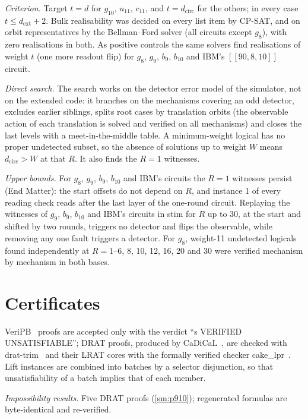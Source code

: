 \documentclass[aps,prl,twocolumn,superscriptaddress,nofootinbib]{revtex4-2}
\newcommand{\dcirc}{d_{\mathrm{circ}}}
\newcommand{\dext}{d_{\mathrm{ext}}}
\newcommand{\code}[1]{[[#1]]}
\begin{document}
\emph{Criterion.} Target $t=d$ for $g_{10}$, $u_{11}$, $c_{11}$, and $t=\dcirc$ for the
others; in every case $t\le\dext+2$. Bulk realisability was decided on every list item by
CP-SAT, and on orbit representatives by the Bellman--Ford solver (all circuits except $g_8$), with
zero realisations in both. As positive controls the same solvers find realisations of weight $t$ (one more
readout flip) for $g_8$, $g_9$, $b_9$, $b_{10}$ and IBM's $\code{90,8,10}$ circuit.

\emph{Direct search.} The search works on the detector error model of the simulator, not on
the extended code: it branches on the mechanisms covering an odd detector, excludes earlier
siblings, splits root cases by translation orbits (the observable action of each
translation is solved and verified on all mechanisms) and closes the last levels with a
meet-in-the-middle table. A minimum-weight logical has no proper undetected subset, so the
absence of solutions up to weight $W$ means $\dcirc>W$ at that $R$. It also finds the $R=1$
witnesses.

\emph{Upper bounds.} For $g_8$, $g_9$, $b_9$, $b_{10}$ and IBM's circuits the $R=1$
witnesses persist (End Matter): the start offsets do not depend on $R$, and instance 1 of
every reading check reads after the last layer of the one-round circuit. Replaying the
witnesses of $g_9$, $b_9$, $b_{10}$ and IBM's circuits in stim for $R$ up to 30, at the start
and shifted by two rounds, triggers no detector and flips the observable, while removing any
one fault triggers a detector. For $g_8$, weight-11 undetected logicals found independently
at $R=1$--6, 8, 10, 12, 16, 20 and 30 were verified mechanism by mechanism in both bases.

\section{Certificates}\label{sm:certs}
VeriPB~\cite{Bogaerts2023,GochtNordstrom2021} proofs are accepted only with the verdict
``s VERIFIED UNSATISFIABLE''; DRAT proofs, produced by CaDiCaL~\cite{CaDiCaL2024}, are
checked with drat-trim~\cite{DRATtrim2014} and their LRAT cores with the formally verified
checker cake\_lpr~\cite{Tan2021cakelpr}. Lift instances are combined into batches by a selector disjunction, so that
unsatisfiability of a batch implies that of each member.

\emph{Impossibility results.} Five DRAT proofs (\ref{sm:p910}); regenerated formulas are
byte-identical and re-verified.
\end{document}
